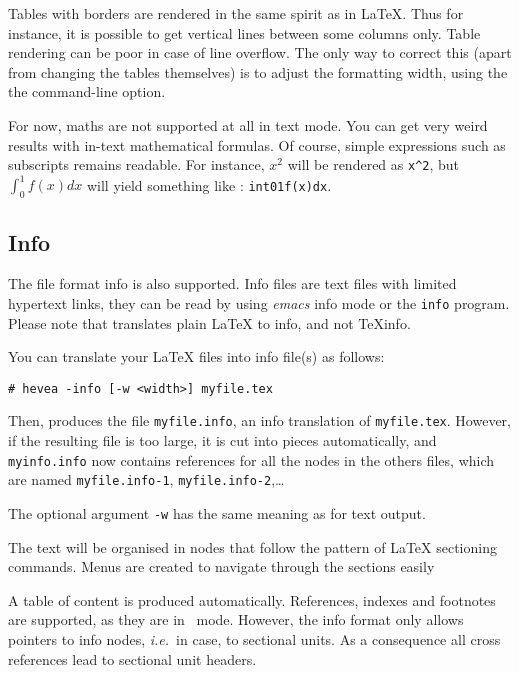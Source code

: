 Tables with borders are rendered in the same spirit as in \LaTeX{}.
Thus for instance, it is possible to get vertical lines between some
columns only.
Table rendering can be poor in case of line overflow.
The only way to correct this (apart from changing the tables
themselves) is to adjust the formatting width, using the
the  command-line option.

For now, maths are not supported at all in text mode. You can get very weird
results with in-text mathematical formulas.
Of course, simple expressions such as subscripts remains readable.
For instance, $x^2$ will be rendered as \verb+x^2+, but $\int_0^1f(x)dx$ will
yield something like : \verb+int01f(x)dx+.


\subsection{Info}
The file format info is also supported.
Info files are text files with limited hypertext links, they
can be read by using \emph{emacs} info mode or the
\texttt{info} program.
Please note that \hevea{} translates plain \LaTeX{} to info, and not
TeXinfo.

You can translate your \LaTeX{} files into info file(s) as follows:
\begin{verbatim}
# hevea -info [-w <width>] myfile.tex
\end{verbatim}
Then, \hevea{} produces the file \texttt{myfile.info}, an info
translation of \texttt{myfile.tex}.
However, if the resulting  file is too large, it is cut into pieces
automatically,
and \texttt{myinfo.info} now contains references for all
the nodes in the others files, which are named \texttt{myfile.info-1},
\texttt{myfile.info-2},\ldots

The optional argument \verb+-w+ has the same meaning as for text output.

The text will be organised in nodes that follow
the pattern of \LaTeX{} sectioning
commands. Menus are created to navigate through the sections easily

A table of content is produced automatically.
References, indexes and footnotes are supported, as they are in
\html{}~mode.
However, the info format only allows pointers to info nodes,
\emph{i.e.}\ in \hevea{} case, to sectional units.
As a consequence all cross references lead to sectional unit headers.


\setcounter{section}{0}
\renewcommand{\thesection}{\thepart.\arabic{section}}
\cutend

